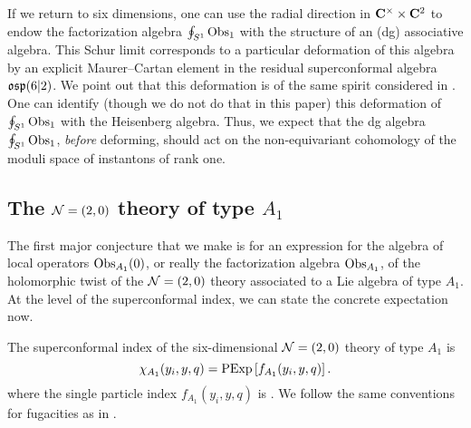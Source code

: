 \documentclass[11pt]{amsart}
\begin{document}
If we return to six dimensions, one can use the radial direction in $\mathbf{C}^\times \times \mathbf{C}^2$ to endow the factorization algebra $\oint_{S^1} \operatorname{Obs}_1$ with the structure of an (dg) associative algebra. 
This Schur limit corresponds to a particular deformation of this algebra by an explicit Maurer--Cartan element in the residual superconformal algebra $\mathfrak{osp}(6|2)$.
We point out that this deformation is of the same spirit considered in \cite{BeemEtAl}.
One can identify (though we do not do that in this paper) this deformation of $\oint_{S^1} \operatorname{Obs}_1$ with the Heisenberg algebra. 
Thus, we expect that the dg algebra $\oint_{S^1} \operatorname{Obs}_1$, {\em before} deforming, should act on the non-equivariant cohomology of the moduli space of instantons of rank one.

\subsection*{The $\mathcal N=(2,0)$ theory of type $A_1$} 

The first major conjecture that we make is for an expression for the algebra of local operators $\operatorname{Obs}_{A_1}(0)$, or really the factorization algebra $\operatorname{Obs}_{A_1}$, of the holomorphic twist of the $\mathcal N=(2,0)$ theory associated to a Lie algebra of type $A_1$. 
At the level of the superconformal index, we can state the concrete expectation now. 

\begin{conj}\label{conj:6dtwo}
The superconformal index of the six-dimensional $\mathcal N=(2,0)$ theory of type $A_1$ is 
\[
\chi_{A_1} (y_i,y,q) = {\rm PExp} \left[f_{A_1}(y_i,y,q) \right] .
\]
where the single particle index $f_{A_1}(y_i,y,q)$ is 
\beqn\label{eqn:A1}
.
\eeqn
We follow the same conventions for fugacities as in \cite{Kim:2013nva}. 
\end{conj}


\end{document}
